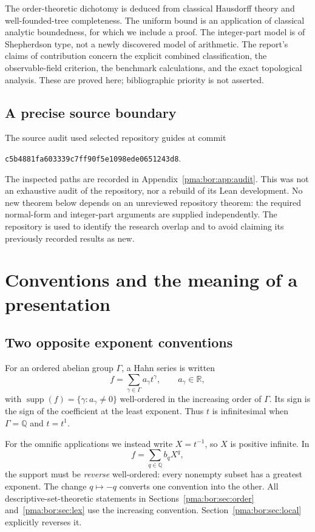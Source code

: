 \documentclass[11pt]{article}
\numberwithin{equation}{section}
\theoremstyle{definition}
\theoremstyle{remark}
\newcommand{\Q}{\mathbb Q}
\newcommand{\R}{\mathbb R}
\newcommand{\supp}{\operatorname{supp}}
\begin{document}
The order-theoretic dichotomy is deduced from classical Hausdorff theory and
well-founded-tree completeness. The uniform bound is an application of
classical analytic boundedness, for which we include a proof. The integer-part
model is of Shepherdson type, not a newly discovered model of arithmetic.
The report's claims of contribution concern the explicit combined
classification, the observable-field criterion, the benchmark calculations,
and the exact topological analysis. These are proved here; bibliographic
priority is not asserted.

\subsection{A precise source boundary}

The source audit used selected repository guides at commit
\begin{center}
\texttt{c5b4881fa603339c7ff90f5e1098ede0651243d8}.
\end{center}
The inspected paths are recorded in Appendix~\ref{pma:bor:app:audit}. This was not an
exhaustive audit of the repository, nor a rebuild of its Lean development.
No new theorem below depends on an unreviewed repository theorem: the required
normal-form and integer-part arguments are supplied independently. The
repository is used to identify the research overlap and to avoid claiming its
previously recorded results as new.

\section{Conventions and the meaning of a presentation}
\label{pma:bor:sec:conventions}

\subsection{Two opposite exponent conventions}

For an ordered abelian group $\Gamma$, a Hahn series is written
\[
 f=\sum_{\gamma\in\Gamma} a_\gamma t^\gamma,
 \qquad a_\gamma\in\R,
\]
with $\supp(f)=\{\gamma:a_\gamma\ne0\}$ well-ordered in the increasing order
of $\Gamma$. Its sign is the sign of the coefficient at the least exponent.
Thus $t$ is infinitesimal when $\Gamma=\Q$ and $t=t^1$.

For the omnific applications we instead write $X=t^{-1}$, so $X$ is positive
infinite. In
\[
 f=\sum_{q\in\Q} b_q X^q,
\]
the support must be \emph{reverse} well-ordered: every nonempty subset has a
greatest exponent. The change $q\mapsto-q$ converts one convention into the
other. All descriptive-set-theoretic statements in Sections~\ref{pma:bor:sec:order}
and~\ref{pma:bor:sec:lex} use the increasing convention. Section~\ref{pma:bor:sec:local}
explicitly reverses it.
\end{document}

